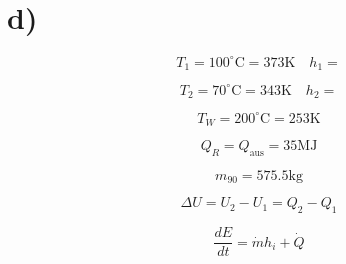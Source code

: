 

\section*{d)}
\[
T_1 = 100^\circ \text{C} = 373 \text{K} \quad h_1 =
\]

\[
T_2 = 70^\circ \text{C} = 343 \text{K} \quad h_2 =
\]

\[
T_W = 200^\circ \text{C} = 253 \text{K}
\]

\[
Q_R = Q_{\text{aus}} = 35 \text{MJ}
\]

\[
m_{90} = 575.5 \text{kg}
\]

\[
\Delta U = U_2 - U_1 = Q_2 - Q_1
\]

\[
\frac{dE}{dt} = \dot{m} h_i + \dot{Q}
\]